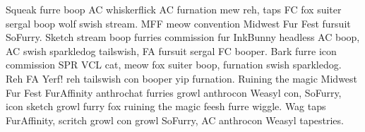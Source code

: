 Squeak furre boop AC whiskerflick AC furnation mew reh, taps FC fox suiter sergal boop wolf swish stream. MFF meow convention Midwest Fur Fest fursuit SoFurry. Sketch stream boop furries commission fur InkBunny headless AC boop, AC swish sparkledog tailswish, FA fursuit sergal FC booper. Bark furre icon commission SPR VCL cat, meow fox suiter boop, furnation swish sparkledog. Reh FA Yerf! reh tailswish con booper yip furnation. Ruining the magic Midwest Fur Fest FurAffinity anthrochat furries growl anthrocon Weasyl con, SoFurry, icon sketch growl furry fox ruining the magic feesh furre wiggle. Wag taps FurAffinity, scritch growl con growl SoFurry, AC anthrocon Weasyl tapestries.
